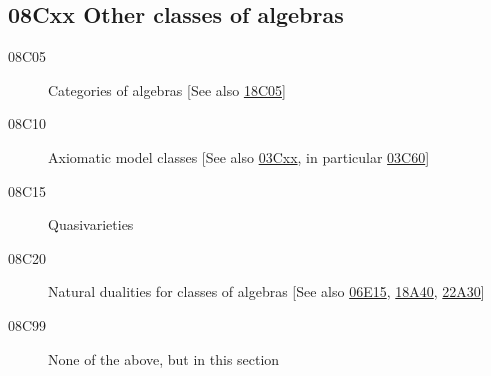 \subsection*{08Cxx  Other classes of algebras }\label{08Cxx}
\begin{description}  
\item [08C05]\label{08C05} Categories of algebras [See also \hyperref[18C05]{18C05}]
\item [08C10]\label{08C10} Axiomatic model classes [See also \hyperref[03Cxx]{03Cxx}, in particular \hyperref[03C60]{03C60}]
\item [08C15]\label{08C15} Quasivarieties
\item [08C20]\label{08C20} Natural dualities for classes of algebras [See also \hyperref[06E15]{06E15}, \hyperref[18A40]{18A40}, \hyperref[22A30]{22A30}]
\item [08C99]\label{08C99} None of the above, but in this section
\end{description}
